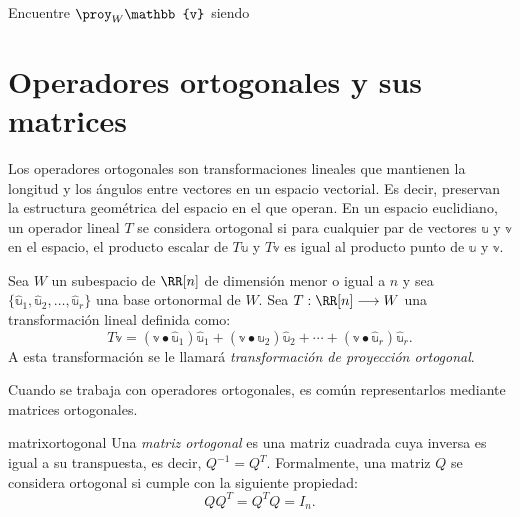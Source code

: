 \begin{examplebox}{}{}
    Encuentre $\proy_W \mathbb{v}$ siendo
\end{examplebox}

\newpage

\section{Operadores ortogonales y sus matrices}

Los operadores ortogonales son transformaciones lineales que mantienen la longitud y los ángulos entre vectores en un espacio vectorial. Es decir, preservan la estructura geométrica del espacio en el que operan. En un espacio euclidiano, un operador lineal $T$ se considera ortogonal si para cualquier par de vectores $\mathbb{u}$ y $\mathbb{v}$ en el espacio, el producto escalar de $T\mathbb{u}$ y $T\mathbb{v}$ es igual al producto punto de $\mathbb{u}$ y $\mathbb{v}$.

\begin{definicion}{}{}
    Sea $W$ un subespacio de $\RR[n]$ de dimensión menor o igual a $n$ y sea $\{ \hat{\mathbb{u}}_1, \hat{\mathbb{u}}_2, \dots, \hat{\mathbb{u}}_r \}$ una base ortonormal de $W$. Sea $T: \RR[n] \longrightarrow W$ una transformación lineal definida como:
    $$T\mathbb{v} = (\mathbb{v} \bullet \hat{\mathbb{u}}_1)\hat{\mathbb{u}}_1 + (\mathbb{v} \bullet \hat{\mathbb{u}}_2)\hat{\mathbb{u}}_2 + \cdots + (\mathbb{v} \bullet \hat{\mathbb{u}}_r)\hat{\mathbb{u}}_r.$$
    A esta transformación se le llamará \emph{transformación de proyección ortogonal}.
\end{definicion}

Cuando se trabaja con operadores ortogonales, es común representarlos mediante matrices ortogonales.

\begin{definicion}{}{matrixortogonal}
    Una \emph{matriz ortogonal} es una matriz cuadrada cuya inversa es igual a su transpuesta, es decir, $Q^{-1} = Q^T$. Formalmente, una matriz $Q$ se considera ortogonal si cumple con la siguiente propiedad:
    $$QQ^T = Q^T Q = I_n.$$
\end{definicion}